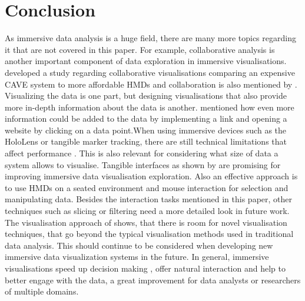 \section{Conclusion}
As immersive data analysis is a huge field, there are many more 
topics regarding it that are not covered in this paper. For example, collaborative analysis is another important component of data exploration in immersive visualisations. \cite{Cordeil2017b} developed a study regarding collaborative visualisations comparing an expensive CAVE system to more affordable \ac{HMD}s and collaboration is also mentioned by \cite{Cordeil2017b}.\newline
Visualizing the data is one part, but designing visualisations that also provide more in-depth information about the data is another. \cite[]{Donalek2015} mentioned how even more information could be added to the data by implementing a link and opening a website by clicking on a data point.\newline When using immersive devices such as the HoloLens or tangible marker tracking, there are still technical limitations that affect performance \autocite[]{Bach2018}. This is also relevant for considering what size of data a system allows to visualise. Tangible interfaces as shown by \cite{Bach2018} are promising for improving immersive data visualisation exploration. Also an effective approach is to use \ac{HMD}s on a seated environment and mouse interaction for selection and manipulating data. Besides the interaction tasks mentioned in this paper, other techniques such as slicing \autocite[]{Issartel2014} or filtering need a more detailed look in future work.\newline
The visualisation approach of \cite{Cordeil2017a} shows, that there is room for novel visualisation techniques, that go beyond the typical visualisation methods used in traditional data analysis. This should continue to be considered when developing new immersive data visualization systems in the future.\newline
In general, immersive visualisations speed up decision making \autocite[]{Kwon2016}, offer natural interaction and help to better engage with the data, a great improvement for data analysts or researchers of multiple domains.